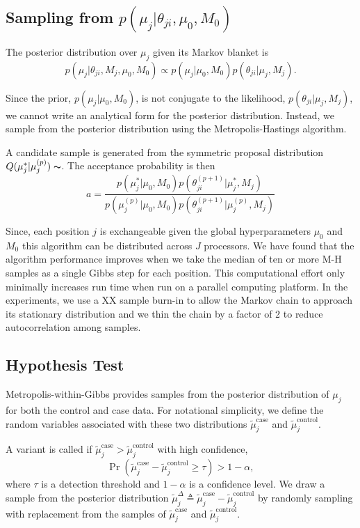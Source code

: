 \documentclass[11pt,reqno]{amsart}
\begin{document}
\subsection{Sampling from $p \left( \mu_j |\theta_{ji},\mu_0,M_0\right)$}
The posterior distribution over $\mu_j$ given its Markov blanket is 
\begin{equation}
	p( \mu_j | \theta_{ji}, M_j, \mu_0, M_0 ) \propto p(\mu_j | \mu_0, M_0) p(\theta_{ji} | \mu_j, M_j).
\end{equation}

Since the prior, $p(\mu_j | \mu_0, M_0)$, is not conjugate to the likelihood, $p(\theta_{ji} | \mu_j, M_j)$, we cannot write an analytical form for the posterior distribution. Instead, we sample from the posterior distribution using the Metropolis-Hastings algorithm.

A candidate sample is generated from the symmetric proposal distribution $Q(\mu_j^* | \mu_j^{(p)}) \thicksim $. The acceptance probability is then
\begin{equation}
	a = \frac{ p(\mu_j^* | \mu_0, M_0) p(\theta^{(p+1)}_{ji} | \mu_j^*, M_j) } {p(\mu_j^{(p)} | \mu_0, M_0) p(\theta^{(p+1)}_{ji} | \mu_j^{(p)}, M_j)}
\end{equation}

Since, each position $j$ is exchangeable given the global hyperparameters $\mu_0$ and $M_0$ this algorithm can be distributed across $J$ processors. We have found that the algorithm performance improves when we take the median of ten or more M-H samples as a single Gibbs step for each position. This computational effort only minimally increases run time when run on a parallel computing platform. In the experiments, we use a XX sample burn-in to allow the Markov chain to approach its stationary distribution and we thin the chain by a factor of 2 to reduce autocorrelation among samples.

\subsection{Hypothesis Test}
Metropolis-within-Gibbs provides samples from the posterior distribution of $\mu_j$ for both the control and case data. For notational simplicity, we define the random variables associated with these two distributions $\tilde{\mu}_j^{\text{case}}$ and $\tilde{\mu}_j^{\text{control}}$.

A variant is called if $\tilde{\mu}_j^{\text{case}} > \tilde{\mu}_j^{\text{control}}$ with high confidence,
\begin{equation}
	\Pr( \tilde{\mu}_j^{\text{case}} - \tilde{\mu}_j^{\text{control}} \geq \tau ) > 1-\alpha,
\end{equation}
where $\tau$ is a detection threshold and $1-\alpha$ is a confidence level. We draw a sample from the posterior distribution $\tilde{\mu}_j^{\Delta} \triangleq \tilde{\mu}_j^{\text{case}} - \tilde{\mu}_j^{\text{control}}$ by randomly sampling with replacement from the samples of $\tilde{\mu}_j^{\text{case}}$ and $\tilde{\mu}_j^{\text{control}}$.
\end{document}
